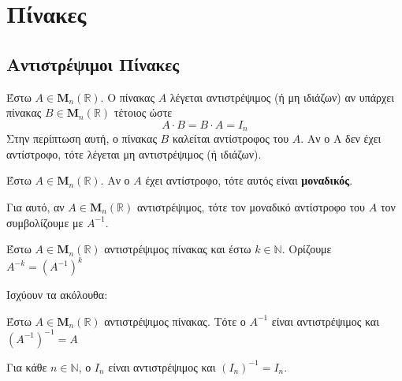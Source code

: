 






\chapter*{Πίνακες}

\section*{Αντιστρέψιμοι Πίνακες}

\begin{dfn}
  Έστω $ A \in \textbf{M}_{n}(\mathbb{R}) $. Ο πίνακας $ A $ λέγεται
  \textcolor{Col1}{αντιστρέψιμος} (ή μη ιδιάζων) αν υπάρχει πίνακας 
  $ B \in \textbf{M}_{n}(\mathbb{R}) $ τέτοιος ώστε 
  \[
    A\cdot B = B \cdot A = I_{n} 
  \] 
  Στην περίπτωση αυτή, ο πίνακας $ B $ καλείται \textcolor{Col1}{αντίστροφος} του $A$. 
  Αν ο Α δεν έχει αντίστροφο, τότε λέγεται μη αντιστρέψιμος (ή ιδιάζων).
\end{dfn}

\begin{prop}
  Έστω $ A \in \textbf{M}_{n}(\mathbb{R}) $. Αν ο $A$ έχει αντίστροφο, τότε αυτός είναι 
  \textbf{μοναδικός}. 
\end{prop}

\begin{rem}
  Για αυτό, αν $ A \in \textbf{M}_{n}(\mathbb{R}) $ αντιστρέψιμος, τότε τον μοναδικό 
  αντίστροφο του $ A $ τον συμβολίζουμε με $ A^{-1} $.
\end{rem}

\begin{dfn}
  Έστω $ A \in \textbf{M}_{n}(\mathbb{R}) $ αντιστρέψιμος πίνακας και έστω $ k \in
  \mathbb{N} $. Ορίζουμε $ A^{-k} = (A^{-1})^{k} $ 
\end{dfn}

\begin{prop}
  Ισχύουν τα ακόλουθα:
  \begin{myitemize}
    \item Έστω $ A \in \textbf{M}_{n}(\mathbb{R}) $ αντιστρέψιμος πίνακας. Τότε ο 
      $ A^{-1} $ είναι αντιστρέψιμος και $ (A^{-1})^{-1} = A $
    \item Για κάθε $ n \in \mathbb{N} $, ο $ I_{n} $ είναι αντιστρέψιμος και 
      $ (I_{n})^{-1}=I_{n} $.
  \end{myitemize}
\end{prop}

